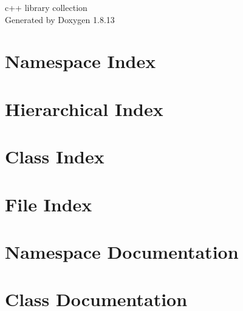 \documentclass[twoside]{book}
\newcommand{\+}{\discretionary{\mbox{\scriptsize$\hookleftarrow$}}{}{}}
\newcommand{\clearemptydoublepage}{%
  \newpage{\pagestyle{empty}\cleardoublepage}%
}
\begin{document}
\hypersetup{pageanchor=false,
             bookmarksnumbered=true,
             pdfencoding=unicode
            }
\begin{titlepage}
\vspace*{7cm}
\begin{center}%
{\Large c++ library collection }\\
\vspace*{1cm}
{\large Generated by Doxygen 1.8.13}\\
\end{center}
\end{titlepage}
\clearemptydoublepage
{}
\tableofcontents
\clearemptydoublepage
{}
\hypersetup{pageanchor=true}

\chapter{Namespace Index}

\chapter{Hierarchical Index}

\chapter{Class Index}

\chapter{File Index}

\chapter{Namespace Documentation}







\chapter{Class Documentation}
























\end{document}
